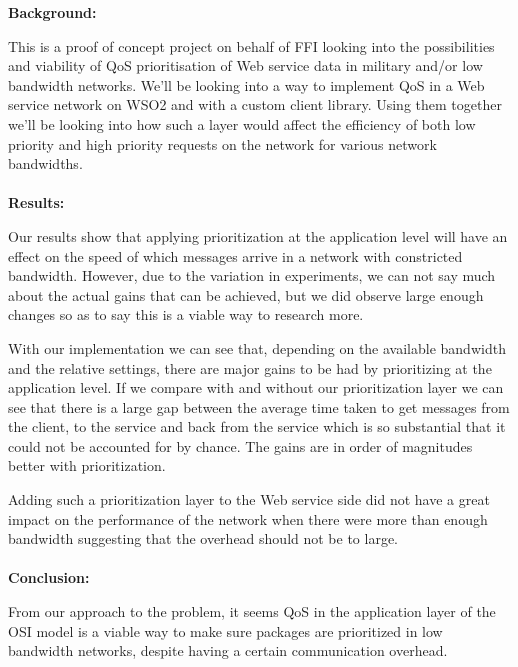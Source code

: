 {\bf Background:}

This is a proof of concept project on behalf of FFI looking into the possibilities and viability of QoS prioritisation of Web service data in military and/or low bandwidth networks.
We’ll be looking into a way to implement QoS in a Web service network on WSO2 and with a custom client library.
Using them together we’ll be looking into how such a layer would affect the efficiency of both low priority and high priority requests on the network for various network bandwidths.
\\\\
{\bf Results:}

Our results show that applying prioritization at the application level will have an effect on the speed of which messages arrive in a network with constricted bandwidth. However, due to the variation in experiments, we can not say much about the actual gains that can be achieved, but we did observe large enough changes so as to say this is a viable way to research more.

With our implementation we can see that, depending on the available bandwidth and the relative settings, there are major gains to be had by prioritizing at the application level. If we compare with and without our prioritization layer we can see that there is a large gap between the average time taken to get messages from the client, to the service and back from the service which is so substantial that it could not be accounted for by chance. The gains are in order of magnitudes better with prioritization.

Adding such a prioritization layer to the Web service side did not have a great impact on the performance of the network when there were more than enough bandwidth suggesting that the overhead should not be to large.
\\\\
{\bf Conclusion:}

From our approach to the problem, it seems QoS in the application layer of the OSI model is a viable way to make sure packages are prioritized in low bandwidth networks, despite having a certain communication overhead.